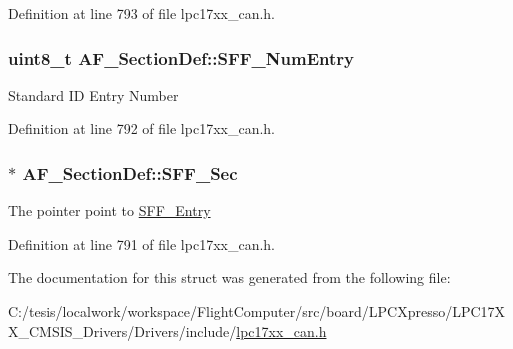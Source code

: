 \-Definition at line 793 of file lpc17xx\-\_\-can.\-h.

\hypertarget{struct_a_f___section_def_a0fe6f998e94c282b49d81604bc28c110}{
\subsubsection[{\-S\-F\-F\-\_\-\-Num\-Entry}]{\setlength{\rightskip}{0pt plus 5cm}uint8\-\_\-t {\bf \-A\-F\-\_\-\-Section\-Def\-::\-S\-F\-F\-\_\-\-Num\-Entry}}}\label{struct_a_f___section_def_a0fe6f998e94c282b49d81604bc28c110}
\-Standard \-I\-D \-Entry \-Number 

\-Definition at line 792 of file lpc17xx\-\_\-can.\-h.

\hypertarget{struct_a_f___section_def_a186af2dbb59fd767dbd1d0ee8d96dde6}{
\subsubsection[{\-S\-F\-F\-\_\-\-Sec}]{$\ast$ {\bf \-A\-F\-\_\-\-Section\-Def\-::\-S\-F\-F\-\_\-\-Sec}}}\label{struct_a_f___section_def_a186af2dbb59fd767dbd1d0ee8d96dde6}
\-The pointer point to \hyperlink{struct_s_f_f___entry}{\-S\-F\-F\-\_\-\-Entry} 

\-Definition at line 791 of file lpc17xx\-\_\-can.\-h.



\-The documentation for this struct was generated from the following file\-:\begin{DoxyCompactItemize}
\item 
\-C\-:/tesis/localwork/workspace/\-Flight\-Computer/src/board/\-L\-P\-C\-Xpresso/\-L\-P\-C17\-X\-X\-\_\-\-C\-M\-S\-I\-S\-\_\-\-Drivers/\-Drivers/include/\hyperlink{lpc17xx__can_8h}{lpc17xx\-\_\-can.\-h}\end{DoxyCompactItemize}
